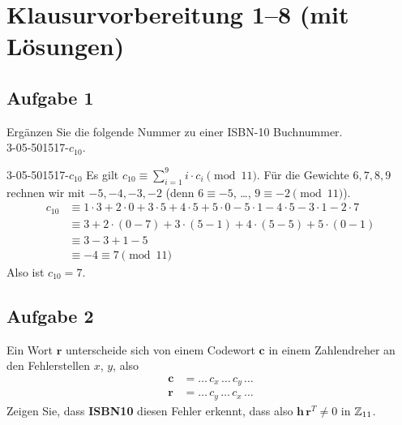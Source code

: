 
\section{Klausurvorbereitung 1--8 (mit Lösungen)}
\subsection{Aufgabe 1}

\begin{aufgabe}[Aufgabe 1]
Ergänzen Sie die folgende Nummer zu einer ISBN-10 Buchnummer.\\
3-05-501517-$c_{10}$.
\end{aufgabe}

\begin{loesung}
3-05-501517-$c_{10}$
Es gilt $c_{10} \equiv \sum_{i=1}^{9} i \cdot c_i \pmod{11}$. Für die Gewichte $6, 7, 8, 9$ rechnen wir mit $-5, -4, -3, -2$ (denn $6 \equiv -5$, \dots, $9 \equiv -2 \pmod{11}$).
\begin{align*}
c_{10} &\equiv 1 \cdot 3 + 2 \cdot 0 + 3 \cdot 5 + 4 \cdot 5 + 5 \cdot 0 - 5 \cdot 1 - 4 \cdot 5 - 3 \cdot 1 - 2 \cdot 7\\
&\equiv 3 + 2 \cdot (0-7) + 3 \cdot (5-1) + 4 \cdot (5-5) + 5 \cdot (0-1)\\
&\equiv 3 - 3 + 1 - 5\\
&\equiv -4 \equiv 7 \pmod{11}
\end{align*}
Also ist $c_{10} = 7$.
\end{loesung}

\subsection{Aufgabe 2}

\begin{aufgabe}[Aufgabe 2]
Ein Wort $\mathbf{r}$ unterscheide sich von einem Codewort $\mathbf{c}$ in einem Zahlendreher an den Fehlerstellen $x$, $y$, also
\begin{align*}
\mathbf{c} &= \dots\, c_x \,\dots\, c_y \,\dots\\
\mathbf{r} &= \dots\, c_y \,\dots\, c_x \,\dots
\end{align*}
Zeigen Sie, dass \textbf{ISBN10} diesen Fehler erkennt, dass also $\mathbf{h}\,\mathbf{r}^T \neq 0$ in $\mathbb{Z}_{11}$.
\end{aufgabe}


